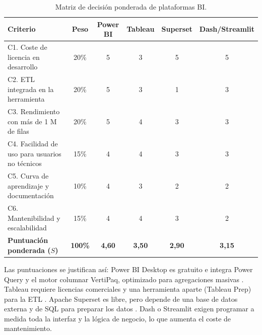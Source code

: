 \documentclass[12pt, a4paper, oneside]{report}
\begin{document}
\begin{table}[H]
\centering
\small
\renewcommand{\arraystretch}{1.1}
\setlength{\tabcolsep}{4pt}
\begin{tabularx}{\textwidth}{@{} X c c c c c @{}}
\toprule
\textbf{Criterio} & \textbf{Peso} & \textbf{Power BI} & \textbf{Tableau} & \textbf{Superset} & \textbf{Dash/Streamlit} \\ \midrule
C1. Coste de licencia en desarrollo & 20\% & 5 & 3 & 5 & 5 \\
C2. ETL integrada en la herramienta & 20\% & 5 & 3 & 1 & 3 \\
C3. Rendimiento con más de 1 M de filas & 20\% & 5 & 4 & 3 & 3 \\
C4. Facilidad de uso para usuarios no técnicos & 15\% & 4 & 4 & 3 & 3 \\
C5. Curva de aprendizaje y documentación & 10\% & 4 & 3 & 2 & 2 \\
C6. Mantenibilidad y escalabilidad & 15\% & 4 & 4 & 3 & 2 \\ \midrule
\textbf{Puntuación ponderada ($S$)} & \textbf{100\%} & \textbf{4,60} & \textbf{3,50} & \textbf{2,90} & \textbf{3,15} \\ \bottomrule
\end{tabularx}
\caption{Matriz de decisión ponderada de plataformas BI.}
\label{tab:matriz_decision}
\end{table}

Las puntuaciones se justifican así: Power BI Desktop es gratuito \cite{ms_powerbi_pricing} e integra Power Query y el motor columnar VertiPaq, optimizado para agregaciones masivas \cite{ferrari2019definitive}. Tableau requiere licencias comerciales y una herramienta aparte (Tableau Prep) para la ETL \cite{tableau_pricing}. Apache Superset es libre, pero depende de una base de datos externa y de SQL para preparar los datos \cite{apache_superset}. Dash o Streamlit exigen programar a medida toda la interfaz y la lógica de negocio, lo que aumenta el coste de mantenimiento.
\end{document}

